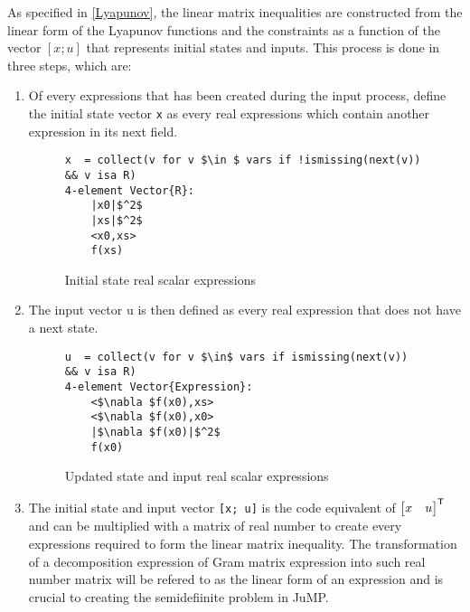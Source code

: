As specified in \cref{Lyapunov}, the linear matrix inequalities are constructed from the linear form of the Lyapunov functions and the constraints as a function of the vector $[x; u]$ that represents initial states and inputs. This process is done in three steps, which are:
\begin{enumerate}
    \item Of every expressions that has been created during the input process, define the initial state vector \texttt{x} as every real expressions which contain another expression in its next field.
\begin{figure}[h!]
    \begin{lstlisting}[mathescape]
x  = collect(v for v $\in $ vars if !ismissing(next(v)) && v isa R)
4-element Vector{R}:
    |x0|$^2$
    |xs|$^2$
    <x0,xs>
    f(xs)
\end{lstlisting}
\caption{Initial state real scalar expressions}
\label{ex_initstate}
\end{figure}

    \item The input vector u is then defined as every real expression that does not have a next state.
    \begin{figure}[h!]
        \begin{lstlisting}[mathescape]    
u  = collect(v for v $\in$ vars if ismissing(next(v)) && v isa R)
4-element Vector{Expression}:
    <$\nabla $f(x0),xs>
    <$\nabla $f(x0),x0>
    |$\nabla $f(x0)|$^2$
    f(x0)
        \end{lstlisting}    
    \caption{Updated state and input real scalar expressions}
    \label{ex_updatedstate_input}
    \end{figure}
    \item The initial state and input vector \texttt{[x; u]} is the code equivalent of $\begin{bmatrix}x & u\end{bmatrix}^{\mathsf{T}}$ and can be multiplied with a matrix of real number to create every expressions required to form the linear matrix inequality. The transformation of a decomposition expression of Gram matrix expression into such real number matrix will be refered to as the linear form of an expression and is crucial to creating the semidefiinite problem in JuMP.
\end{enumerate}

